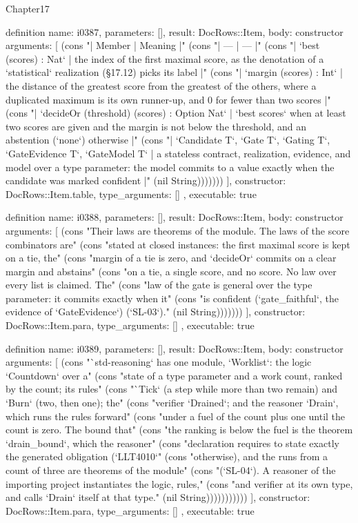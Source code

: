 \begin{lexlean}{Chapter17}
\begin{semanticmodule}
definition{
  name: i0387,
  parameters: [],
  result: DocRows::Item,
  body: constructor{
    arguments: [
      (cons "| Member | Meaning |" (cons "| --- | --- |" (cons "| `best (scores) : Nat` | the index of the first maximal score, as the denotation of a `statistical` realization (§17.12) picks its label |" (cons "| `margin (scores) : Int` | the distance of the greatest score from the greatest of the others, where a duplicated maximum is its own runner-up, and 0 for fewer than two scores |" (cons "| `decideOr (threshold) (scores) : Option Nat` | `best scores` when at least two scores are given and the margin is not below the threshold, and an abstention (`none`) otherwise |" (cons "| `Candidate T`, `Gate T`, `Gating T`, `GateEvidence T`, `GateModel T` | a stateless contract, realization, evidence, and model over a type parameter: the model commits to a value exactly when the candidate was marked confident |" (nil String)))))))
    ],
    constructor: DocRows::Item.table,
    type_arguments: []
  },
  executable: true
}

definition{
  name: i0388,
  parameters: [],
  result: DocRows::Item,
  body: constructor{
    arguments: [
      (cons "Their laws are theorems of the module. The laws of the score combinators are" (cons "stated at closed instances: the first maximal score is kept on a tie, the" (cons "margin of a tie is zero, and `decideOr` commits on a clear margin and abstains" (cons "on a tie, a single score, and no score. No law over every list is claimed. The" (cons "law of the gate is general over the type parameter: it commits exactly when it" (cons "is confident (`gate_faithful`, the evidence of `GateEvidence`) (`SL-03`)." (nil String)))))))
    ],
    constructor: DocRows::Item.para,
    type_arguments: []
  },
  executable: true
}

definition{
  name: i0389,
  parameters: [],
  result: DocRows::Item,
  body: constructor{
    arguments: [
      (cons "`std-reasoning` has one module, `Worklist`: the logic `Countdown` over a" (cons "state of a type parameter and a work count, ranked by the count; its rules" (cons "`Tick` (a step while more than two remain) and `Burn` (two, then one); the" (cons "verifier `Drained`; and the reasoner `Drain`, which runs the rules forward" (cons "under a fuel of the count plus one until the count is zero. The bound that" (cons "the ranking is below the fuel is the theorem `drain_bound`, which the reasoner" (cons "declaration requires to state exactly the generated obligation (`LLT4010`" (cons "otherwise), and the runs from a count of three are theorems of the module" (cons "(`SL-04`). A reasoner of the importing project instantiates the logic, rules," (cons "and verifier at its own type, and calls `Drain` itself at that type." (nil String)))))))))))
    ],
    constructor: DocRows::Item.para,
    type_arguments: []
  },
  executable: true
}


\end{semanticmodule}
\end{lexlean}
